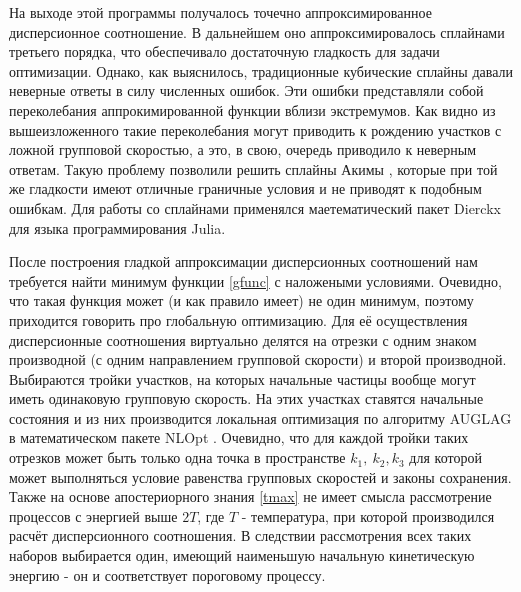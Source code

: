\documentclass[../main.tex]{subfiles}
\begin{document}
        На выходе этой программы получалось точечно аппроксимированное дисперсионное 
        соотношение. В дальнейшем оно аппроксимировалось сплайнами третьего порядка,
        что обеспечивало достаточную гладкость для задачи оптимизации. Однако, 
        как выяснилось, традиционные кубические сплайны давали неверные ответы в силу
        численных ошибок. Эти ошибки представляли собой переколебания аппрокимированной
        функции вблизи экстремумов. Как видно из вышеизложенного такие переколебания 
        могут приводить к рождению участков с ложной групповой скоростью, а это, в свою,
        очередь приводило к неверным ответам. Такую проблему позволили решить сплайны 
        Акимы \cite{AkimaSplines}, которые при той же гладкости имеют отличные граничные 
        условия и не приводят к подобным ошибкам. Для работы со сплайнами применялся
        маетематический пакет Dierckx \cite{Dierckx} для языка программирования 
        Julia. 

        После построения гладкой аппроксимации дисперсионных соотношений нам требуется 
        найти минимум функции \ref{gfunc} с наложеными условиями. Очевидно, что такая 
        функция может (и как правило имеет) не один минимум, поэтому приходится говорить
        про глобальную оптимизацию. Для её осуществления дисперсионные соотношения виртуально
        делятся на отрезки с одним знаком производной (с одним направлением групповой скорости)
        и второй производной. Выбираются тройки участков, на которых начальные частицы вообще 
        могут иметь одинаковую групповую скорость. На этих участках ставятся начальные состояния
        и из них производится локальная оптимизация по алгоритму AUGLAG \cite{AuglagOptim} в математическом пакете NLOpt
        \cite{NLopt}. Очевидно, что для каждой тройки таких отрезков
        может быть только одна точка в пространстве $k_1,~k_2,k_3$ для которой может выполняться
        условие равенства групповых скоростей и законы сохранения. Также на основе апостериорного 
        знания \ref{tmax} не имеет смысла рассмотрение 
        процессов с энергией выше $2T$, где $T$ - температура, при которой производился расчёт 
        дисперсионного соотношения. В следствии рассмотрения всех 
        таких наборов выбирается один, имеющий наименьшую начальную кинетическую энергию - он и 
        соответствует пороговому процессу.
\end{document}
